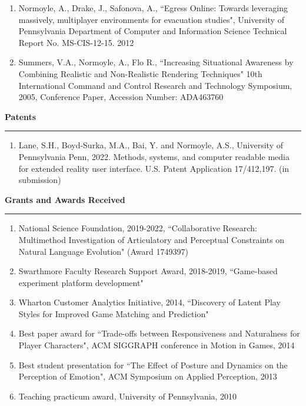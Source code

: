 \begin{enumerate}[leftmargin=*]
\item Normoyle, A., Drake, J., Safonova, A., ``Egress Online: Towards leveraging massively, multiplayer environments for evacuation studies", University of Pennsylvania Department of Computer and Information Science Technical Report No. MS-CIS-12-15. 2012

\item Summers, V.A., Normoyle, A., Flo R., ``Increasing Situational Awareness by Combining Realistic and Non-Realistic Rendering Techniques" 10th International Command and Control Research and Technology Symposium, 2005, Conference Paper,  Accession Number: ADA463760 
\end{enumerate}

\medskip
\medskip

{\Large {\bf Patents}}
\vspace{0.1cm}
\hrule
\medskip

\begin{enumerate}[leftmargin=*]
  \item  Lane, S.H., Boyd-Surka, M.A., Bai, Y. and Normoyle, A.S., University of Pennsylvania Penn, 2022. Methods, systems, and computer readable media for extended reality user interface. U.S. Patent Application 17/412,197. (in submission)
\end{enumerate}

\medskip
\medskip

{\Large {\bf Grants and Awards Received}}
\vspace{0.1cm}
\hrule
\medskip

\begin{enumerate}[leftmargin=*]
\item National Science Foundation, 2019-2022, 
``Collaborative Research: Multimethod Investigation of Articulatory and Perceptual Constraints on Natural Language Evolution" (Award 1749397)

\item Swarthmore Faculty Research Support Award, 2018-2019, ``Game-based experiment platform development"

\item Wharton Customer Analytics Initiative, 2014, ``Discovery of Latent Play Styles for Improved Game Matching and Prediction"

\item Best paper award for ``Trade-offs between Responsiveness and Naturalness for Player Characters", ACM SIGGRAPH conference in Motion in Games, 2014

\item Best student presentation for ``The Effect of Posture and Dynamics on the Perception of Emotion", ACM Symposium on Applied Perception, 2013

\item Teaching practicum award, University of Pennsylvania, 2010
\end{enumerate}


